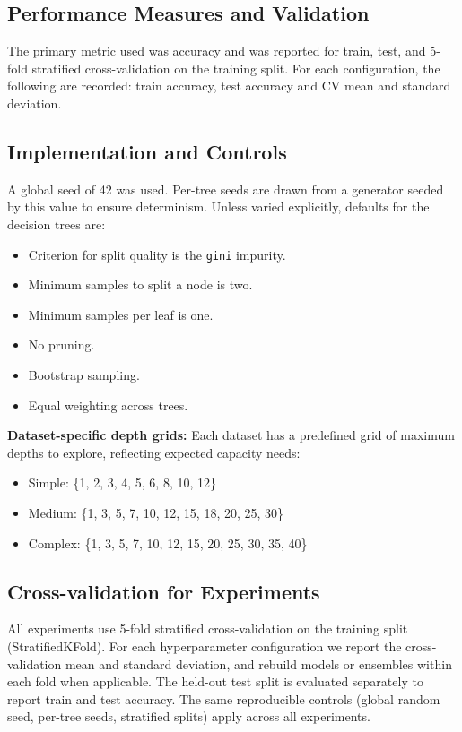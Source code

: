\documentclass[conference]{IEEEtran}
\begin{document}
\subsection{Performance Measures and Validation}
The primary metric used was accuracy and was reported for train, test, and 5-fold stratified cross-validation on the training split. For each configuration, the following are 
recorded: train accuracy, test accuracy and CV mean and standard deviation. 

\subsection{Implementation and Controls}
A global seed of 42 was used. Per-tree seeds are drawn from a generator seeded by this value to ensure determinism. Unless varied explicitly, defaults for the 
decision trees are:
\begin{itemize}
  \item Criterion for split quality is the \texttt{gini} impurity.
  \item Minimum samples to split a node is two.
  \item Minimum samples per leaf is one.
  \item No pruning.
  \item Bootstrap sampling.
  \item Equal weighting across trees.
\end{itemize}

\textbf{Dataset-specific depth grids:} Each dataset has a predefined grid of maximum depths to explore, reflecting expected capacity needs:
\begin{itemize}
  \item Simple: \{1, 2, 3, 4, 5, 6, 8, 10, 12\}
  \item Medium: \{1, 3, 5, 7, 10, 12, 15, 18, 20, 25, 30\}
  \item Complex: \{1, 3, 5, 7, 10, 12, 15, 20, 25, 30, 35, 40\}
\end{itemize}

\subsection{Cross-validation for Experiments}
All experiments use 5-fold stratified cross-validation on the training split (StratifiedKFold). For each hyperparameter configuration we report the cross-validation mean and standard deviation, and rebuild models or ensembles within each fold when applicable. The held-out test split is evaluated separately to report train and test accuracy. The same reproducible controls (global random seed, per-tree seeds, stratified splits) apply across all experiments.
\end{document}
